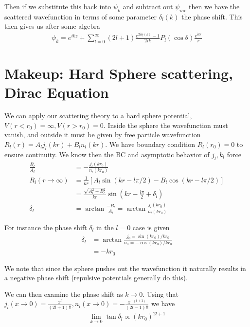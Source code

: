 \documentclass[10pt]{report}
\begin{document}
Then if we substitute this back into $\psi_k$ and subtract out $\psi_{inc}$ then we have the scattered wavefunction in terms of some parameter $\delta_l(k)$ the phase shift. This then gives us after some algebra
\begin{align}
    \psi_k = e^{ikz} + \sum_{l=0}^{\infty}(2l+1)\frac{e^{2i\delta_l(k)} - 1}{2ik}P_l(\cos\theta)\frac{e^{ikr}}{r}
\end{align}

\chapter{Makeup: Hard Sphere scattering, Dirac Equation}

We can apply our scattering theory to a hard sphere potential, $V(r < r_0) = \infty, V(r > r_0) = 0$. Inside the sphere the wavefunction must vanish, and outside it must be given by free particle wavefunction $R_l(r) = A_lj_l(kr) + B_ln_l(kr)$. We have boundary condition $R_l(r_0) = 0$ to ensure continuity. We know then the BC and asymptotic behavior of $j_l, k_l$ force
\begin{align}
    \frac{B_l}{A_l} &= -\frac{j_l(kr_0)}{n_l(kr_0)}\\
    R_l\left( r\to\infty \right) &= \frac{1}{kr}\left[ A_l\sin\left( kr - l\pi/2 \right) - B_l\cos\left( kr - l\pi/2 \right) \right]\\
    &= \frac{\sqrt{A_l^2 + B_l^2}}{kr}\sin\left( kr - \frac{l\pi}{2} + \delta_l \right)\\
    \delta_l &= \arctan \frac{-B_l}{A_l} = \arctan\frac{j_l(kr_0)}{n_l(kr_0)}
\end{align}

For instance the phase shift $\delta_l$ in the $l=0$ case is given
\begin{align}
    \delta_l &= \arctan \frac{j_0 = \sin(kr_0)/kr_0}{n_0 = -\cos(kr_0)/kr_0}\\
    &= -kr_0
\end{align}

We note that since the sphere pushes out the wavefunction it naturally results in a negative phase shift (repulsive potentials generally do this).

We can then examine the phase shift as $k \to 0$. Using that $j_l(x\to0) = \frac{x^l}{(2l+1)!!}, n_l(x\to0) = -\frac{x^{-(l+1)}}{(2l-1)!!}$ we have
\begin{align}
    \lim_{k\to 0}\tan \delta_l \propto (kr_0)^{2l+1}
\end{align}
\end{document}
